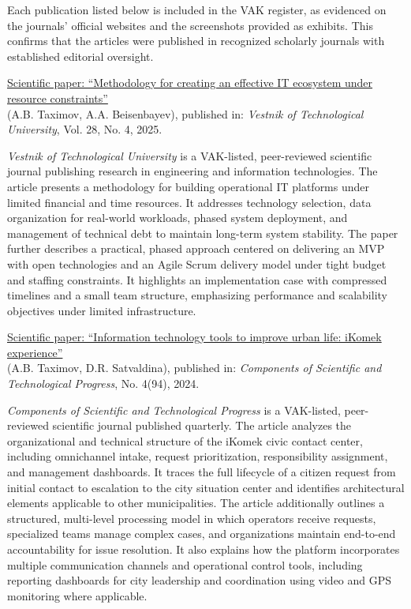 Each publication listed below is included in the VAK register, as evidenced on the journals’ official websites and the screenshots provided as exhibits. This confirms that the articles were published in recognized scholarly journals with established editorial oversight.

\bigskip

\noindent\underline{Scientific paper: ``Methodology for creating an effective IT ecosystem under resource constraints''} \\
(A.B. Taximov, A.A. Beisenbayev), published in: \emph{Vestnik of Technological University}, Vol. 28, No. 4, 2025.

\emph{Vestnik of Technological University} is a VAK-listed, peer-reviewed scientific journal publishing research in engineering and information technologies. The article presents a methodology for building operational IT platforms under limited financial and time resources. It addresses technology selection, data organization for real-world workloads, phased system deployment, and management of technical debt to maintain long-term system stability. The paper further describes a practical, phased approach centered on delivering an MVP with open technologies and an Agile Scrum delivery model under tight budget and staffing constraints. It highlights an implementation case with compressed timelines and a small team structure, emphasizing performance and scalability objectives under limited infrastructure.
\bigskip

\noindent\underline{Scientific paper: ``Information technology tools to improve urban life: iKomek experience''} \\
(A.B. Taximov, D.R. Satvaldina), published in: \emph{Components of Scientific and Technological Progress}, No. 4(94), 2024.

\emph{Components of Scientific and Technological Progress} is a VAK-listed, peer-reviewed scientific journal published quarterly. The article analyzes the organizational and technical structure of the iKomek civic contact center, including omnichannel intake, request prioritization, responsibility assignment, and management dashboards. It traces the full lifecycle of a citizen request from initial contact to escalation to the city situation center and identifies architectural elements applicable to other municipalities. The article additionally outlines a structured, multi-level processing model in which operators receive requests, specialized teams manage complex cases, and organizations maintain end-to-end accountability for issue resolution. It also explains how the platform incorporates multiple communication channels and operational control tools, including reporting dashboards for city leadership and coordination using video and GPS monitoring where applicable.
\bigskip

